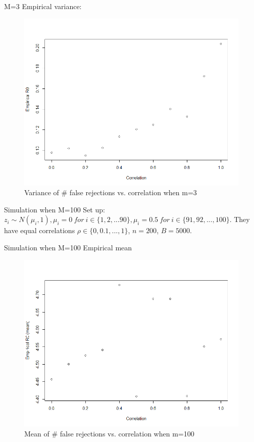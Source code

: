 \documentclass{beamer}
\begin{document}
\begin{frame}[t]{M=3}\vspace{10pt}
Empirical variance:
\begin{figure}[h]
	\centering
	\includegraphics[scale=0.35]{empirical_m=3_var}
	\caption{\footnotesize{Variance of \# false rejections vs. correlation when m=3}}
	\label{fig8}
\end{figure}
\end{frame}

\begin{frame}[t]{Simulation when M=100}\vspace{10pt}
Set up: $z_i \sim N(\mu_i,1), \mu_i =0 \ for \ i \in \{1,2,...90\}, \mu_i = 0.5\ for \ i \in \{91,92,...,100\}$. They have equal correlations $\rho \in \{0,0.1,...,1\}$, $n=200$, $B=5000$.
\end{frame}

\begin{frame}[t]{Simulation when M=100}\vspace{10pt}
Empirical mean
\begin{figure}[h]
	\centering
	\includegraphics[scale=0.35]{empirical_m=100}
	\caption{\footnotesize{Mean of \# false rejections vs. correlation when m=100}}
	\label{fig9}
\end{figure}
\end{frame}
\end{document}
